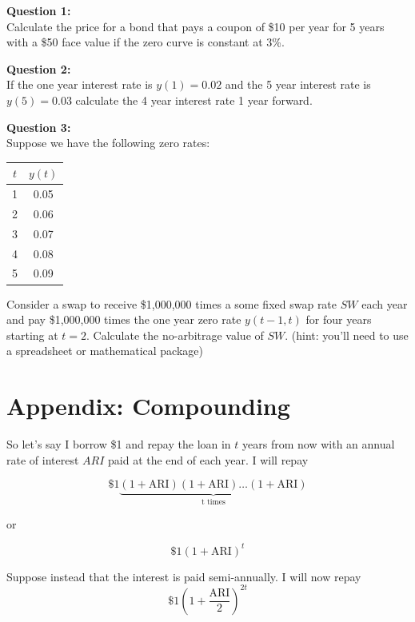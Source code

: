 \documentclass{tran-l}
\theoremstyle{definition}
\theoremstyle{remark}
\numberwithin{equation}{subsection}
\begin{document}
\textbf{Question 1:}\\
Calculate the price for a bond that pays a coupon of \$10 per year for 5 years with a \$50 face value if the zero curve is constant at 3\%.

\textbf{Question 2:}\\
If the one year interest rate is $y(1) = 0.02$ and the 5 year interest rate is $y(5) = 0.03$ calculate the 4 year interest rate 1 year forward.

\textbf{Question 3:}\\
Suppose we have the following zero rates:\\
\begin{center}
\begin{tabular}{|c|c|}
  \hline
  $t$ & $y(t)$ \\
  \hline
  1&0.05 \\
  2&0.06 \\
  3&0.07 \\
  4&0.08 \\
  5&0.09\\
  \hline
\end{tabular}
\end{center}


Consider a swap to receive \$1,000,000 times a some fixed swap rate $SW$ each year and pay \$1,000,000 times the one year zero rate $y(t-1,t)$ for four years starting at $t=2$. Calculate the no-arbitrage value of $SW$. (hint: you'll need to use a spreadsheet or mathematical package)





\section*{Appendix: Compounding}


So let's say I borrow \$1 and repay the loan in $t$ years from now with an annual rate of interest $ARI$ paid at the end of each year. I will repay

\[ \$1\underbrace{\left(1+\mbox{ARI}\right)\left(1+\mbox{ARI}\right)\ldots\left(1+\mbox{ARI}\right)}_{\mbox{t times}} \]


or

 \[\$1\left(1+\mbox{ARI}\right)^t \]

Suppose instead that the interest is paid semi-annually. I will now repay \[\$1\left(1+\frac{\mbox{ARI}}{2}\right)^{2t} \]
\end{document}
